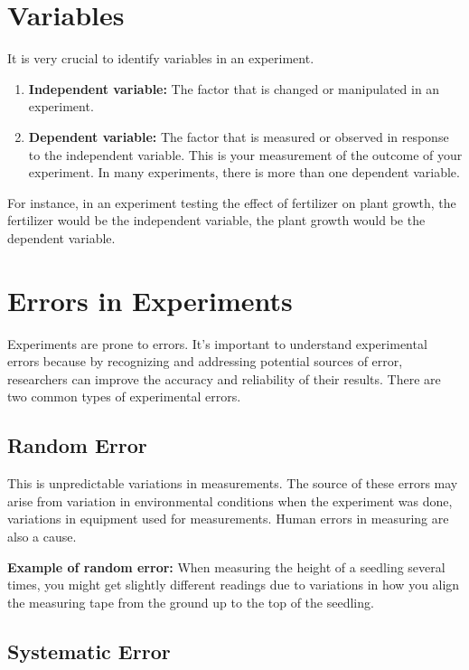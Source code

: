 \documentclass[
]{book}
\providecommand{\tightlist}{%
  \setlength{\itemsep}{0pt}\setlength{\parskip}{0pt}}
\begin{document}
\section{Variables}\label{variables}

It is very crucial to identify variables in an experiment.

\begin{enumerate}
\def\labelenumi{\arabic{enumi}.}
\tightlist
\item
  \textbf{Independent variable:} The factor that is changed or manipulated in an experiment.
\item
  \textbf{Dependent variable:} The factor that is measured or observed in response to the independent variable. This is your measurement of the outcome of your experiment. In many experiments, there is more than one dependent variable.
\end{enumerate}

For instance, in an experiment testing the effect of fertilizer on plant growth, the fertilizer would be the independent variable, the plant growth would be the dependent variable.

\section{Errors in Experiments}\label{errors-in-experiments}

Experiments are prone to errors. It's important to understand experimental errors because by recognizing and addressing potential sources of error, researchers can improve the accuracy and reliability of their results. There are two common types of experimental errors.

\subsection{Random Error}\label{random-error}

This is unpredictable variations in measurements. The source of these errors may arise from variation in environmental conditions when the experiment was done, variations in equipment used for measurements. Human errors in measuring are also a cause.

\textbf{Example of random error:} When measuring the height of a seedling several times, you might get slightly different readings due to variations in how you align the measuring tape from the ground up to the top of the seedling.

\subsection{Systematic Error}\label{systematic-error}
\end{document}
